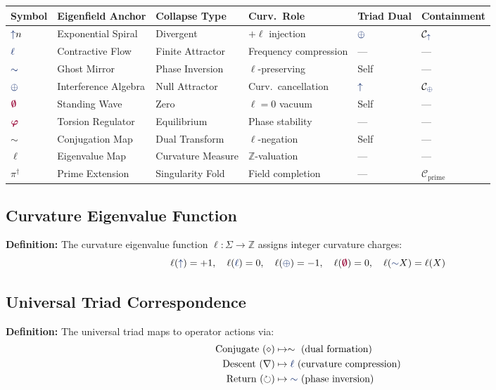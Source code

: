 \vspace{-1.2em}
\begin{center}
\renewcommand{\arraystretch}{1.25}
\begin{tabular}{llllll}
\hline
\textbf{Symbol} &
\textbf{Eigenfield Anchor} &
\textbf{Collapse Type} &
\textbf{Curv.\ Role} &
\textbf{Triad Dual} &
\textbf{Containment} \\
\hline
$\grow n$ &
Exponential Spiral &
Divergent &
$+\!\ell$ injection &
$\fuse$ &
$\mathcal{C}_{\grow}$ \\
$\lha$ &
Contractive Flow &
Finite Attractor &
Frequency compression &
— &
— \\
$\reflec$ &
Ghost Mirror &
Phase Inversion &
$\ell$-preserving &
Self &
— \\
$\fuse$ &
Interference Algebra &
Null Attractor &
Curv.\ cancellation &
$\grow$ &
$\mathcal{C}_{\fuse}$ \\
$\void$ &
Standing Wave &
Zero &
$\ell=0$ vacuum &
Self &
— \\
$\gold$ &
Torsion Regulator &
Equilibrium &
Phase stability &
— &
— \\
$\sim$ &
Conjugation Map &
Dual Transform &
$\ell$-negation &
Self &
— \\
$\ell$ &
Eigenvalue Map &
Curvature Measure &
$\mathbb{Z}$-valuation &
— &
— \\
$\pi^\dagger$ &
Prime Extension &
Singularity Fold &
Field completion &
— &
$\mathcal{C}_{\text{prime}}$ \\
\hline
\end{tabular}
\end{center}

\subsection{Curvature Eigenvalue Function}
\textbf{Definition:} The curvature eigenvalue function $\ell: \Sigma \to \mathbb{Z}$ assigns integer curvature charges:
\[
\ell(\grow) = +1, \quad \ell(\lha) = 0, \quad \ell(\fuse) = -1, \quad \ell(\void) = 0, \quad \ell(\reflec X) = \ell(X)
\]

\subsection{Universal Triad Correspondence}
\textbf{Definition:} The universal triad maps to operator actions via:
\begin{align}
\text{Conjugate } (\diamond) &\mapsto \sim \text{ (dual formation)} \\
\text{Descent } (\nabla) &\mapsto \lha \text{ (curvature compression)} \\
\text{Return } (\circlearrowright) &\mapsto \reflec \text{ (phase inversion)}
\end{align}


